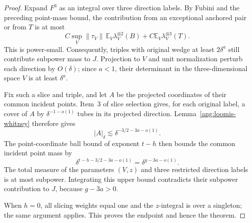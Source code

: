 \begin{proof}
Expand $F^3$ as an integral over three direction labels. By Fubini and the preceding point-mass bound, the contribution from an exceptional anchored pair or from $T$ is at most
\[
 C\sup_V\|\tau_V\|\,
       \mathbb E_V\lambda_V^{\otimes2}(B)
 +C\mathbb E_V\lambda_V^{\otimes3}(T).
\]
This is power-small. Consequently, triples with original wedge at least $2\delta^a$ still contribute subpower mass to $J$. Projection to $V$ and unit normalization perturb each direction by $O(\delta)$; since $a<1$, their determinant in the three-dimensional space $V$ is at least $\delta^a$.

Fix such a slice and triple, and let $A$ be the projected coordinates of their common incident points. Item~3 of slice selection gives, for each original label, a cover of $A$ by $\delta^{-1-o(1)}$ tubes in its projected direction. Lemma~\ref{ang:loomis-whitney} therefore gives
\[
 |A|_\delta\lesssim\delta^{-3/2-3a-o(1)}.
\]
The point-coordinate ball bound of exponent $t-h$ then bounds the common incident point mass by
\[
 \delta^{t-h-3/2-3a-o(1)}
 =\delta^{g-3a-o(1)}.
\]
The total measure of the parameters $(V,z)$ and three restricted direction labels is at most subpower. Integrating this upper bound contradicts their subpower contribution to $J$, because $g-3a>0$.

When $h=0$, all slicing weights equal one and the $z$-integral is over a singleton; the same argument applies. This proves the endpoint and hence the theorem.
\end{proof}
